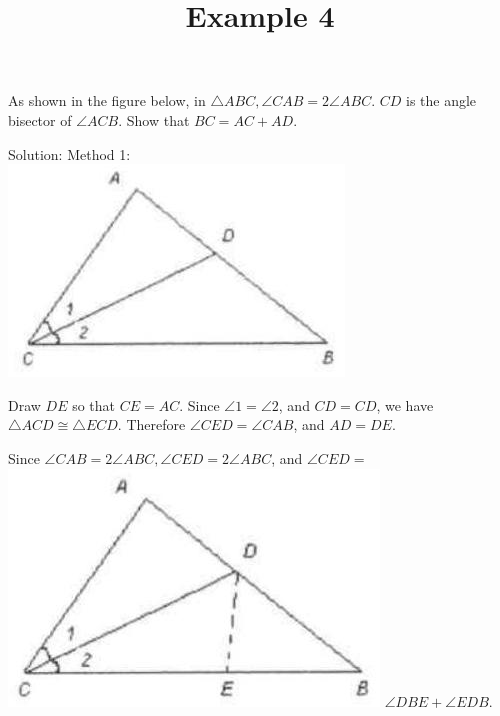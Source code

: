 \documentclass{article}
\title{Example 4}
\date{}
\begin{document}
\maketitle

As shown in the figure below, in \(\triangle A B C, \angle C A B=2 \angle A B C\). \(C D\) is the angle bisector of \(\angle A C B\). Show that \(B C=A C+A D\).

Solution:
Method 1:\\
\centering
\includegraphics[width=\textwidth]{images/056.jpg}

Draw \(D E\) so that \(C E=A C\). Since \(\angle 1=\angle 2\), and \(C D=C D\), we have \(\triangle A C D \cong \triangle E C D\). Therefore \(\angle C E D=\angle C A B\), and \(A D=D E\).

Since \(\angle C A B=2 \angle A B C, \angle C E D=2 \angle A B C\), and \(\angle C E D=\)\\
\includegraphics[width=\textwidth]{images/056(1).jpg} \(\angle D B E+\angle E D B\).
\end{document}

